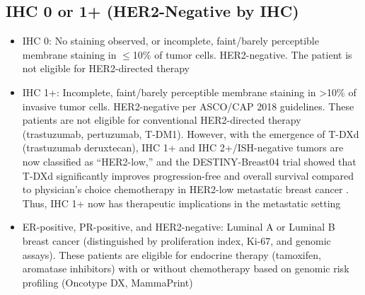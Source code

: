 \subsection*{IHC 0 or 1+ (HER2-Negative by IHC)}
\begin{itemize}
  \item IHC 0: No staining observed, or incomplete, faint/barely perceptible membrane staining in $\leq$10\% of tumor cells. HER2-negative. The patient is not eligible for HER2-directed therapy
  \item IHC 1+: Incomplete, faint/barely perceptible membrane staining in >10\% of invasive tumor cells. HER2-negative per ASCO/CAP 2018 guidelines. These patients are not eligible for conventional HER2-directed therapy (trastuzumab, pertuzumab, T-DM1). However, with the emergence of T-DXd (trastuzumab deruxtecan), IHC 1+ and IHC 2+/ISH-negative tumors are now classified as ``HER2-low,'' and the DESTINY-Breast04 trial showed that T-DXd significantly improves progression-free and overall survival compared to physician's choice chemotherapy in HER2-low metastatic breast cancer \cite{modi2022trastuzumab}. Thus, IHC 1+ now has therapeutic implications in the metastatic setting
  \item ER-positive, PR-positive, and HER2-negative: Luminal A or Luminal B breast cancer (distinguished by proliferation index, Ki-67, and genomic assays). These patients are eligible for endocrine therapy (tamoxifen, aromatase inhibitors) with or without chemotherapy based on genomic risk profiling (Oncotype DX, MammaPrint)
\end{itemize}

